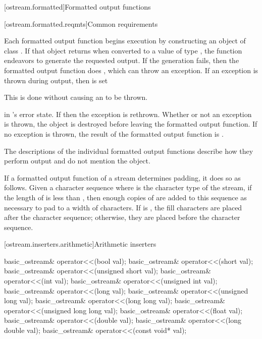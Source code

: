 [ostream.formatted]{Formatted output functions}

[ostream.formatted.reqmts]{Common requirements}

\pnum
Each formatted output function begins execution by constructing an object of class
.
If that object returns
when converted to a value of type
,
the function endeavors
to generate the requested output.
If the generation fails, then the formatted output function does
,
which can throw an exception.
If an exception is thrown during output, then
is set
\begin{footnote}
This is done without causing an
to be thrown.
\end{footnote}
in
's
error state.
If
then the exception is rethrown.
Whether or not an exception is thrown, the
object is destroyed before leaving the formatted output function.
If no exception is thrown, the result of the formatted output function
is
.

\pnum
The descriptions of the individual formatted output functions
describe how they perform
output and do not mention the
object.

\pnum
If a formatted output function of a stream  determines
padding, it does so as
follows. Given a  character sequence  where
 is the character type of the stream, if
the length of  is less than , then enough copies of
 are added to this sequence as necessary to pad to a
width of  characters. If
 is
, the fill characters are placed
after the character sequence; otherwise, they are placed before the
character sequence.

[ostream.inserters.arithmetic]{Arithmetic inserters}

%
\begin{itemdecl}
basic_ostream& operator<<(bool val);
basic_ostream& operator<<(short val);
basic_ostream& operator<<(unsigned short val);
basic_ostream& operator<<(int val);
basic_ostream& operator<<(unsigned int val);
basic_ostream& operator<<(long val);
basic_ostream& operator<<(unsigned long val);
basic_ostream& operator<<(long long val);
basic_ostream& operator<<(unsigned long long val);
basic_ostream& operator<<(float val);
basic_ostream& operator<<(double val);
basic_ostream& operator<<(long double val);
basic_ostream& operator<<(const void* val);
\end{itemdecl}


